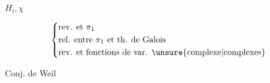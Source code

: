 


$H_i,\chi$

\[
\left\{\begin{aligned}
&\text{rev. et }\pi_1\\
&\text{rel. entre }\pi_1\text{ et th. de Galois}\\
&\text{rev. et fonctions de var. }\text{\unsure{complexe|complexes}}
\end{aligned}\right.
\]

Conj. de Weil
